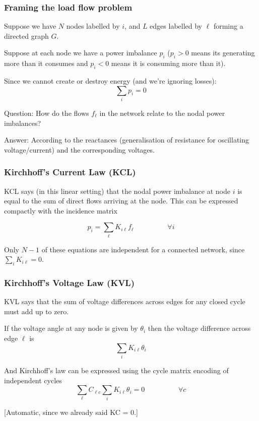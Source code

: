 \documentclass[10pt,aspectratio=169,dvipsnames]{beamer}
\begin{document}
\begin{frame}
  \frametitle{Framing the load flow problem}

  Suppose we have $N$ nodes labelled by $i$, and $L$ edges labelled by
  $\ell$ forming a directed graph $G$.

  Suppose at each node we have a \alert{power imbalance} $p_i$ ($p_i >
  0$ means its generating more than it consumes and $p_i < 0$ means it
  is consuming more than it).

  Since we cannot create or destroy energy (and we're ignoring losses):
  \begin{equation*}
    \sum_i p_i = 0
  \end{equation*}

  \alert{Question}: How do the flows $f_\ell$ in the network relate to the nodal power
  imbalances?

  \alert{Answer}: According to the reactances (generalisation of
  resistance for oscillating voltage/current) and the corresponding
  voltages.

\end{frame}



\begin{frame}
  \frametitle{Kirchhoff's Current Law (KCL)}

  KCL says (in this linear setting) that the nodal power imbalance at
  node $i$ is equal to the sum of direct flows arriving at the
  node. This can be expressed compactly with the incidence matrix

  \begin{equation*}
    p_i = \sum_\ell K_{i\ell} f_\ell \hspace{2cm} \forall i
  \end{equation*}


  Only $N-1$ of these equations are independent for a connected network, since $\sum_i K_{i\ell} = 0$.
\end{frame}


\begin{frame}
  \frametitle{Kirchhoff's Voltage Law (KVL)}

  KVL says that the sum of voltage differences across edges for any
  closed cycle must add up to zero.

  If the voltage angle at any node is given by $\theta_i$ then the voltage difference across edge $\ell$ is
  \begin{equation*}
    \sum_i K_{i\ell} \theta_i
  \end{equation*}

  And Kirchhoff's law can be expressed using the cycle matrix encoding of independent cycles
  \begin{equation*}
    \sum_\ell C_{\ell c} \sum_i K_{i\ell} \theta_i = 0 \hspace{2cm} \forall c
  \end{equation*}

  [Automatic, since we already said KC = 0.]


\end{frame}
\end{document}
